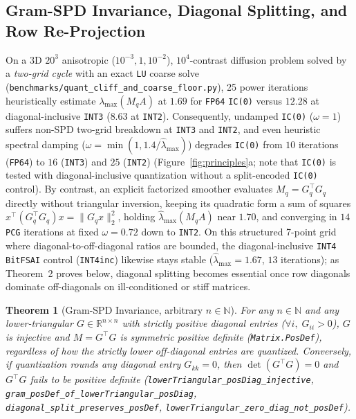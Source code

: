 \documentclass[10pt]{article}
\newtheorem{theorem}{Theorem}
\begin{document}
\subsection{Gram-SPD Invariance, Diagonal Splitting, and Row Re-Projection}
On a 3D $20^3$ anisotropic ($10^{-3}, 1, 10^{-2}$), $10^4$-contrast diffusion problem solved by a \emph{two-grid cycle} with an exact \texttt{LU} coarse solve (\texttt{benchmarks/quant\_cliff\_and\_coarse\_floor.py}), 25 power iterations heuristically estimate $\lambda_{\max}(M_q A)$ at $1.69$ for \texttt{FP64} \texttt{IC(0)} versus $12.28$ at diagonal-inclusive \texttt{INT3} ($8.63$ at \texttt{INT2}). Consequently, undamped \texttt{IC(0)} ($\omega = 1$) suffers non-SPD two-grid breakdown at \texttt{INT3} and \texttt{INT2}, and even heuristic spectral damping ($\omega = \min(1, 1.4/\hat{\lambda}_{\max})$) degrades \texttt{IC(0)} from $10$ iterations (\texttt{FP64}) to $16$ (\texttt{INT3}) and $25$ (\texttt{INT2}) (Figure~\ref{fig:principles}a; note that \texttt{IC(0)} is tested with diagonal-inclusive quantization without a split-encoded \texttt{IC(0)} control). By contrast, an explicit factorized smoother evaluates $M_q = G_q^\top G_q$ directly without triangular inversion, keeping its quadratic form a sum of squares $x^\top(G_q^\top G_q)x = \|G_q x\|_2^2$, holding $\hat{\lambda}_{\max}(M_q A)$ near $1.70$, and converging in $14$ \texttt{PCG} iterations at fixed $\omega = 0.72$ down to \texttt{INT2}. On this structured 7-point grid where diagonal-to-off-diagonal ratios are bounded, the diagonal-inclusive \texttt{INT4} \texttt{BitFSAI} control (\texttt{INT4inc}) likewise stays stable ($\hat{\lambda}_{\max} = 1.67$, $13$ iterations); as Theorem~2 proves below, diagonal splitting becomes essential once row diagonals dominate off-diagonals on ill-conditioned or stiff matrices.

\begin{theorem}[Gram-SPD Invariance, arbitrary $n \in \mathbb{N}$]
For any $n \in \mathbb{N}$ and any lower-triangular $G \in \mathbb{R}^{n \times n}$ with strictly positive diagonal entries ($\forall i,\; G_{ii} > 0$), $G$ is injective and $M = G^\top G$ is symmetric positive definite (\texttt{Matrix.PosDef}), regardless of how the strictly lower off-diagonal entries are quantized. Conversely, if quantization rounds any diagonal entry $G_{kk} = 0$, then $\det(G^\top G) = 0$ and $G^\top G$ fails to be positive definite (\texttt{lowerTriangular\_posDiag\_injective}, \texttt{gram\_posDef\_of\_lowerTriangular\_posDiag}, \texttt{diagonal\_split\_preserves\_posDef}, \texttt{lowerTriangular\_zero\_diag\_not\_posDef}).
\end{theorem}
\end{document}
